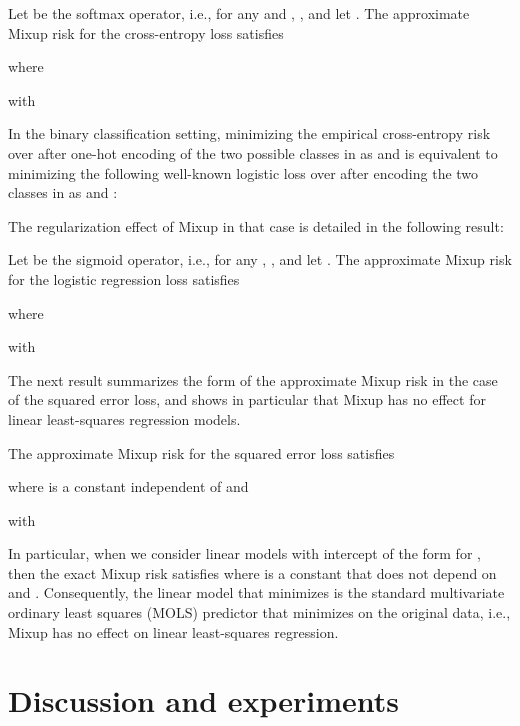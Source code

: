 \documentclass[twoside,11pt]{article}
\begin{document}
\begin{corollary}\label{cor:CEloss}
Let  be the softmax operator, i.e., 
for any  and , , 
and let . The approximate Mixup risk for the cross-entropy loss satisfies

where

with

\end{corollary}

In the binary classification setting, minimizing the empirical cross-entropy risk over  after one-hot encoding of the two possible classes in  as  and  is equivalent to minimizing the following well-known logistic loss over  after encoding the two classes in  as  and :

The regularization effect of Mixup in that case is detailed in the following result:
\begin{corollary}\label{cor:logisticloss}
Let  be the sigmoid operator, i.e., 
for any , , and 
let . The approximate Mixup risk for the logistic regression loss satisfies

where

with

\end{corollary}

The next result summarizes the form of the approximate Mixup risk in the case of the squared error loss, 
and shows in particular that Mixup has no effect for linear least-squares regression models.
\begin{corollary}\label{cor:SEloss}
The approximate Mixup risk for the squared error loss satisfies

where  is a constant independent of  and

with

In particular, when we consider linear models with intercept of the form  for , then the exact Mixup risk satisfies 
where  is a constant that does not depend on  and . Consequently, the linear model that minimizes  is the standard multivariate ordinary least squares (MOLS) predictor that minimizes  on the original data, i.e., Mixup has no effect on linear least-squares regression.
\end{corollary}


 


 \section{Discussion and experiments}\label{sec:discussion}
\end{document}
